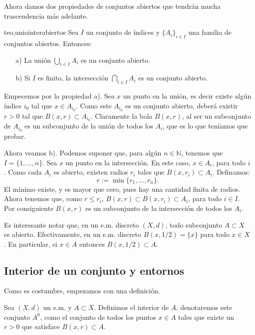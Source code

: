 Ahora damos dos propiedades de conjuntos abiertos que tendrán
mucha trascendencia más adelante.
\begin{teorema}{teo,uniointerabiertos} Sea $I$ un conjunto de índices y
$\{A_i\}_{i\in I}$ una familia de conjuntos abiertos. Entonces:
\begin{itemize}
\item[a)] La unión $\bigcup_{i\in I}A_i$ es un conjunto abierto.
\item[b)] Si $I$ es finito, la intersección $\bigcap_{i\in
I}A_i$ es un conjunto abierto.
\end{itemize}
\end{teorema}
\begin{demo} Empecemos por la propiedad a). Sea $x$ un punto en la
unión, es decir existe algún índice $i_0$ tal que $x\in
A_{i_0}$. Como este $A_{i_0}$ es un conjunto abierto, deberá
existir $r>0$ tal que $B(x,r)\subset A_{i_0}$. Claramente la bola
$B(x,r)$, al ser un subconjunto de $A_{i_0}$ es un subconjunto de
la unión de todos los $A_i$, que es lo que teníamos que
probar.

Ahora veamos b). Podemos suponer que, para algún $n\in
\mathbb{N}$, tenemos que $I=\{1,\dots,n\}$. Sea $x$ un punto en la
intersección. En este caso, $x\in A_i$, para todo $i$. Como cada
$A_i$ es abierto, existen radios $r_i$ tales que $B(x,r_i)\subset
A_i$. Definamos:
\[
	r:=\min\{r_1,\dots,r_n\}.
\]
El mínimo existe, y es mayor que cero, pues hay una cantidad
finita de radios. Ahora tenemos que, como $r\leq r_i$,
$B(x,r)\subset B(x,r_i)\subset A_i$, para todo $i\in I$. Por
consiguiente $B(x,r)$ es un subconjunto de la intersección de
todos los $A_i$.
\end{demo}

Es interesante notar que, en un e.m. discreto $(X,d)$, todo
subconjunto $A\subset X$ es abierto. Efectivamente, en un e.m.
discreto $B(x,1/2)=\{x\}$ para todo $x\in X$. En particular, si
$x\in A$ entonces $B(x,1/2)\subset A$.

\subsection{Interior de un conjunto y entornos} Como es costumbre,
empezamos con una definición.
\begin{definicion}{} Sea $(X,d)$ un e.m. y $A\subset X$. Definimos
el interior de $A$, denotaremos este conjunto $A^0$, como el
conjunto de todos los puntos $x\in A$ tales que existe un $r>0$
que satisface $B(x,r)\subset A$.
\end{definicion}

